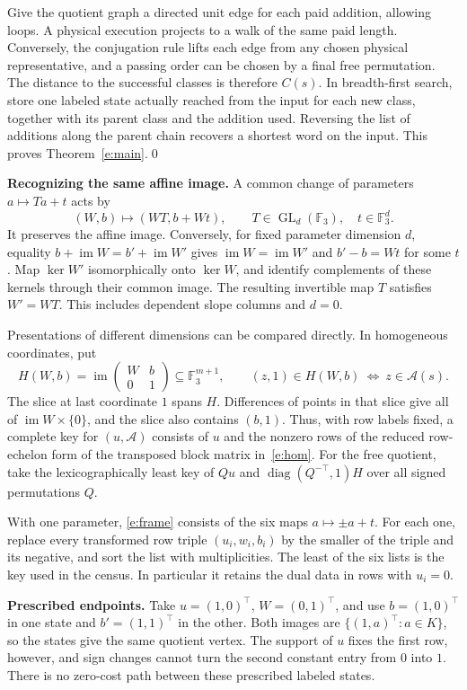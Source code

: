 \documentclass[UTF8,a4paper,11pt,scheme=plain]{ctexart}
\theoremstyle{zh}
\theoremstyle{plain}
\newcommand{\F}{\mathbb F_3}
\newcommand{\A}{\mathcal A}
\newcommand{\im}{\operatorname{im}}
\newcommand{\GL}{\operatorname{GL}}
\newcommand{\frameeq}{(W,b)\longmapsto(WT,b+Wt),\qquad T\in\GL_d(\F),\quad t\in\F^d.}
\newcommand{\homoeq}{H(W,b)=\im\begin{pmatrix}W&b\\0&1\end{pmatrix}\subseteq \F^{m+1},
       \qquad (z,1)\in H(W,b)\ \Longleftrightarrow\ z\in\A(s).}
\begin{document}
Give the quotient graph a directed unit edge for each paid addition, allowing loops. A physical
execution projects to a walk of the same paid length. Conversely, the conjugation rule lifts each edge from any
chosen physical representative, and a passing order can be chosen by a final free permutation.
The distance to the successful classes is therefore $C(s)$. In breadth-first search, store
one labeled state actually reached from the input for each new class, together with its
parent class and the addition used. Reversing the list of additions along the parent chain
recovers a shortest word on the input. This proves Theorem~\ref{e:main}.\qed

\medskip\noindent\textbf{Recognizing the same affine image.}
A common change of parameters $a\mapsto Ta+t$ acts by
\begin{equation}\label{e:frame}\frameeq\end{equation}
It preserves the affine image. Conversely, for fixed parameter dimension $d$, equality
$b+\im W=b'+\im W'$ gives $\im W=\im W'$ and $b'-b=Wt$ for some $t$. Map $\ker W'$
isomorphically onto $\ker W$, and identify complements of these kernels through their common
image. The resulting invertible map $T$ satisfies $W'=WT$. This includes dependent slope
columns and $d=0$.

Presentations of different dimensions can be compared directly. In homogeneous coordinates,
put
\begin{equation}\label{e:hom}\homoeq\end{equation}
The slice at last coordinate $1$ spans $H$. Differences of points in that slice give all of
$\im W\times\{0\}$, and the slice also contains $(b,1)$. Thus, with row labels fixed, a
complete key for $(u,\A)$ consists of $u$ and the nonzero rows of the reduced row-echelon
form of the transposed block matrix in~\eqref{e:hom}. For the free quotient, take the
lexicographically least key of $Qu$ and $\operatorname{diag}(Q^{-\top},1)H$ over all signed
permutations $Q$.

With one parameter, \eqref{e:frame} consists of the six maps $a\mapsto\pm a+t$. For each one,
replace every transformed row triple $(u_i,w_i,b_i)$ by the smaller of the triple and its
negative, and sort the list with multiplicities. The least of the six lists is the key used
in the census. In particular it retains the dual data in rows with $u_i=0$.

\medskip\noindent\textbf{Prescribed endpoints.}
Take $u=(1,0)^\top$, $W=(0,1)^\top$, and use $b=(1,0)^\top$ in one state and $b'=(1,1)^\top$
in the other. Both images are $\{(1,a)^\top:a\in K\}$, so the states give the same quotient
vertex. The support of $u$ fixes the first row, however, and sign changes cannot turn the
second constant entry from $0$ into $1$. There is no zero-cost path between these prescribed
labeled states.
\end{document}
